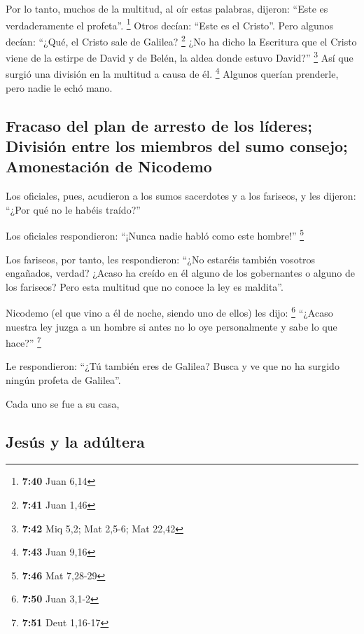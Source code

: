  Por lo tanto, muchos de la multitud, al oír estas
palabras, dijeron: ``Este es verdaderamente el profeta''. \footnote{\textbf{7:40}
  Juan 6,14}  Otros decían: ``Este es el Cristo''. Pero
algunos decían: ``¿Qué, el Cristo sale de Galilea? \footnote{\textbf{7:41}
  Juan 1,46}  ¿No ha dicho la Escritura que el Cristo
viene de la estirpe de David y de Belén, la aldea donde estuvo David?''
\footnote{\textbf{7:42} Miq 5,2; Mat 2,5-6; Mat 22,42} 
Así que surgió una división en la multitud a causa de él. \footnote{\textbf{7:43}
  Juan 9,16}  Algunos querían prenderle, pero nadie le
echó mano.

\hypertarget{fracaso-del-plan-de-arresto-de-los-luxedderes-divisiuxf3n-entre-los-miembros-del-sumo-consejo-amonestaciuxf3n-de-nicodemo}{%
\subsection{Fracaso del plan de arresto de los líderes; División entre
los miembros del sumo consejo; Amonestación de
Nicodemo}\label{fracaso-del-plan-de-arresto-de-los-luxedderes-divisiuxf3n-entre-los-miembros-del-sumo-consejo-amonestaciuxf3n-de-nicodemo}}

 Los oficiales, pues, acudieron a los sumos sacerdotes y
a los fariseos, y les dijeron: ``¿Por qué no le habéis traído?''

 Los oficiales respondieron: ``¡Nunca nadie habló como
este hombre!'' \footnote{\textbf{7:46} Mat 7,28-29}

 Los fariseos, por tanto, les respondieron: ``¿No
estaréis también vosotros engañados, verdad?  ¿Acaso ha
creído en él alguno de los gobernantes o alguno de los fariseos?
 Pero esta multitud que no conoce la ley es maldita''.

 Nicodemo (el que vino a él de noche, siendo uno de
ellos) les dijo: \footnote{\textbf{7:50} Juan 3,1-2} 
``¿Acaso nuestra ley juzga a un hombre si antes no lo oye personalmente
y sabe lo que hace?'' \footnote{\textbf{7:51} Deut 1,16-17}

 Le respondieron: ``¿Tú también eres de Galilea? Busca y
ve que no ha surgido ningún profeta de Galilea''.

 Cada uno se fue a su casa,

\hypertarget{jesuxfas-y-la-aduxfaltera}{%
\subsection{Jesús y la adúltera}\label{jesuxfas-y-la-aduxfaltera}}

